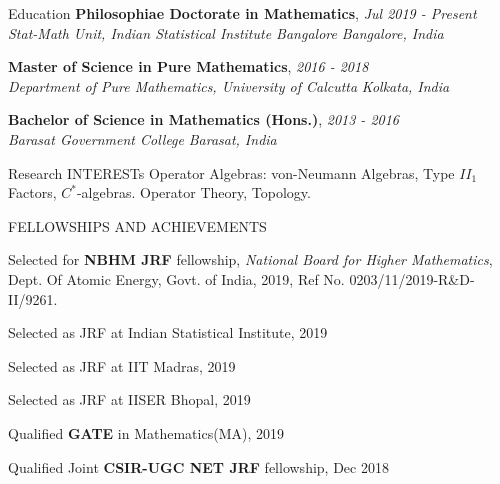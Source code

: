 \documentclass{resume} %
\begin{document}

\begin{rSection}{Education}
{\bf Philosophiae Doctorate in Mathematics},  \hfill {\em Jul 2019 - Present}\\ {\it Stat-Math Unit, Indian Statistical Institute Bangalore} \hfill {\em Bangalore, India}

{\bf Master of Science in Pure Mathematics},  \hfill {\em 2016 - 2018}\\ {\it Department of Pure Mathematics, University of Calcutta} \hfill {\em Kolkata, India}

{\bf Bachelor of Science in Mathematics (Hons.)},  \hfill {\em 2013 - 2016}\\ {\it Barasat Government College} \hfill {\em Barasat, India}

\end{rSection}


\begin{rSection}{Research INTERESTs}
	Operator Algebras: von-Neumann Algebras, Type $II_1$ Factors, $C^*$-algebras. Operator Theory, Topology.
	
\end{rSection}


\begin{rSection}{FELLOWSHIPS AND ACHIEVEMENTS}
	\begin{rSubsection}{}{}{}{}
		\item Selected for \textbf{NBHM JRF} fellowship, \emph{National Board for Higher Mathematics}, Dept. Of Atomic Energy, Govt. of India, 2019, Ref No. 0203/11/2019-R\&D-II/9261.
		
		\item Selected as JRF at Indian Statistical Institute, 2019
		
		\item Selected as JRF at IIT Madras, 2019
		
		\item Selected as JRF at IISER Bhopal, 2019
		
		\item Qualified \textbf{GATE} in Mathematics(MA), 2019
		
		\item Qualified Joint \textbf{CSIR-UGC NET JRF} fellowship, Dec 2018
	\end{rSubsection}

\end{rSection}
\end{document}
